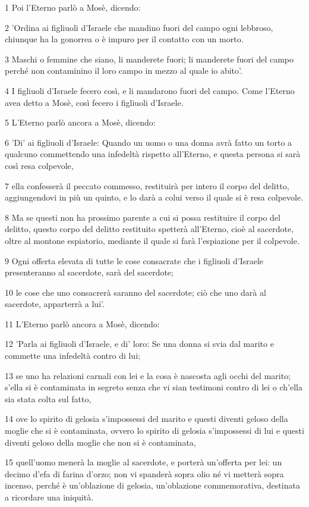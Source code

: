 \par 1 Poi l'Eterno parlò a Mosè, dicendo:
\par 2 'Ordina ai figliuoli d'Israele che mandino fuori del campo ogni lebbroso, chiunque ha la gonorrea o è impuro per il contatto con un morto.
\par 3 Maschi o femmine che siano, li manderete fuori; li manderete fuori del campo perché non contaminino il loro campo in mezzo al quale io abito'.
\par 4 I figliuoli d'Israele fecero così, e li mandarono fuori del campo. Come l'Eterno avea detto a Mosè, così fecero i figliuoli d'Israele.
\par 5 L'Eterno parlò ancora a Mosè, dicendo:
\par 6 'Di' ai figliuoli d'Israele: Quando un uomo o una donna avrà fatto un torto a qualcuno commettendo una infedeltà rispetto all'Eterno, e questa persona si sarà così resa colpevole,
\par 7 ella confesserà il peccato commesso, restituirà per intero il corpo del delitto, aggiungendovi in più un quinto, e lo darà a colui verso il quale si è resa colpevole.
\par 8 Ma se questi non ha prossimo parente a cui si possa restituire il corpo del delitto, questo corpo del delitto restituito spetterà all'Eterno, cioè al sacerdote, oltre al montone espiatorio, mediante il quale si farà l'espiazione per il colpevole.
\par 9 Ogni offerta elevata di tutte le cose consacrate che i figliuoli d'Israele presenteranno al sacerdote, sarà del sacerdote;
\par 10 le cose che uno consacrerà saranno del sacerdote; ciò che uno darà al sacerdote, apparterrà a lui'.
\par 11 L'Eterno parlò ancora a Mosè, dicendo:
\par 12 'Parla ai figliuoli d'Israele, e di' loro: Se una donna si svia dal marito e commette una infedeltà contro di lui;
\par 13 se uno ha relazioni carnali con lei e la cosa è nascosta agli occhi del marito; s'ella si è contaminata in segreto senza che vi sian testimoni contro di lei o ch'ella sia stata colta sul fatto,
\par 14 ove lo spirito di gelosia s'impossessi del marito e questi diventi geloso della moglie che si è contaminata, ovvero lo spirito di gelosia s'impossessi di lui e questi diventi geloso della moglie che non si è contaminata,
\par 15 quell'uomo menerà la moglie al sacerdote, e porterà un'offerta per lei: un decimo d'efa di farina d'orzo; non vi spanderà sopra olio né vi metterà sopra incenso, perché è un'oblazione di gelosia, un'oblazione commemorativa, destinata a ricordare una iniquità.
